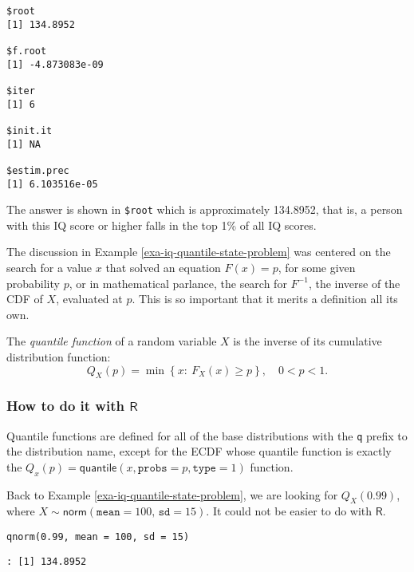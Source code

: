 \begin{verbatim}
$root
[1] 134.8952

$f.root
[1] -4.873083e-09

$iter
[1] 6

$init.it
[1] NA

$estim.prec
[1] 6.103516e-05
\end{verbatim}

The answer is shown in \texttt{\$root} which is approximately 
134.8952, that is, a person with this IQ score or higher falls in the
top 1\% of all IQ scores.


The discussion in Example \ref{exa-iq-quantile-state-problem} was centered on the search for a
value \(x\) that solved an equation \(F(x)=p\), for some given
probability \(p\), or in mathematical parlance, the search for
\(F^{-1}\), the inverse of the CDF of \(X\), evaluated at \(p\). This
is so important that it merits a definition all its own.

\begin{defn}
The \emph{quantile function} of a random variable \(X\) is
the inverse of its cumulative distribution function:
\begin{equation}
Q_{X}(p)=\min\left\{ x:\ F_{X}(x)\geq p\right\} ,\quad 0 < p <1.
\end{equation}
\end{defn}

\subsubsection{How to do it with \(\mathsf{R}\)}
\label{sec-6-3-1-1}

Quantile functions are defined for all of the base distributions with
the \texttt{q} prefix to the distribution name, except for the ECDF whose
quantile function is exactly the \( Q_{x}(p) = \mathsf{quantile}(x,
\mathtt{probs} = p, \mathtt{type} = 1) \) function.


Back to Example \ref{exa-iq-quantile-state-problem}, we are looking for \(Q_{X}(0.99)\), where
\(X\sim\mathsf{norm}(\mathtt{mean}=100,\,\mathtt{sd}=15)\). It could
not be easier to do with \(\mathsf{R}\).

\begin{verbatim}
qnorm(0.99, mean = 100, sd = 15)
\end{verbatim}

\begin{verbatim}
: [1] 134.8952
\end{verbatim}

